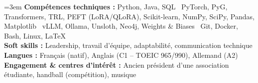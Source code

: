\documentclass[a4paper,10pt]{article}
\begin{document}
\vspace{3pt}
\begingroup\emergencystretch=3em
\textbf{Compétences techniques :} Python, Java, SQL \textbar\ PyTorch, PyG, Transformers, TRL, PEFT (LoRA/QLoRA), \mbox{Scikit-learn}, NumPy, SciPy, Pandas, Matplotlib \textbar\ vLLM, Ollama, Unsloth, Neo4j, Weights \& Biases \textbar\ Git, Docker, Bash, Linux, LaTeX\\
\textbf{Soft skills :} Leadership, travail d'équipe, adaptabilité, communication technique\\
\textbf{Langues :} Français (natif), Anglais (C1 -- TOEIC 965/990), Allemand (A2)\\
\textbf{Engagement \& centres d'intérêt :} Ancien président d'une association étudiante, handball (compétition), musique\par\endgroup

\vfill
\end{document}
